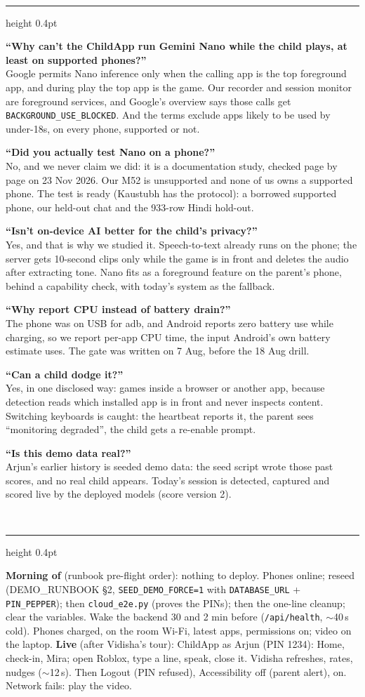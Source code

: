 \documentclass[10pt,a4paper]{article}
\newcommand{\sect}[1]{\vspace{2mm}{\color{teal}\bfseries\small\MakeUppercase{#1}}\\[0.6mm]\hrule height 0.4pt\vspace{1.2mm}}
\newcommand{\qa}[2]{\begin{minipage}{\linewidth}\small\textbf{\color{navy}#1}\\[0.3mm]\color{black!85}#2\end{minipage}\vspace{1.6mm}}
\begin{document}
\sect{Hardest Review 3 questions}
\qa{``Why can't the ChildApp run Gemini Nano while the child plays, at least on supported phones?''}{Google permits Nano inference only when the calling app is the top foreground app, and during play the top app is the game. Our recorder and session monitor are foreground services, and Google's overview says those calls get \texttt{BACKGROUND\_USE\_BLOCKED}. And the terms exclude apps likely to be used by under-18s, on every phone, supported or not.}
\qa{``Did you actually test Nano on a phone?''}{No, and we never claim we did: it is a documentation study, checked page by page on 23 Nov 2026. Our M52 is unsupported and none of us owns a supported phone. The test is ready (Kaustubh has the protocol): a borrowed supported phone, our held-out chat and the 933-row Hindi hold-out.}
\qa{``Isn't on-device AI better for the child's privacy?''}{Yes, and that is why we studied it. Speech-to-text already runs on the phone; the server gets 10-second clips only while the game is in front and deletes the audio after extracting tone. Nano fits as a foreground feature on the parent's phone, behind a capability check, with today's system as the fallback.}
\qa{``Why report CPU instead of battery drain?''}{The phone was on USB for adb, and Android reports zero battery use while charging, so we report per-app CPU time, the input Android's own battery estimate uses. The gate was written on 7 Aug, before the 18 Aug drill.}
\qa{``Can a child dodge it?''}{Yes, in one disclosed way: games inside a browser or another app, because detection reads which installed app is in front and never inspects content. Switching keyboards is caught: the heartbeat reports it, the parent sees ``monitoring degraded'', the child gets a re-enable prompt.}
\qa{``Is this demo data real?''}{Arjun's earlier history is seeded demo data: the seed script wrote those past scores, and no real child appears. Today's session is detected, captured and scored live by the deployed models (score version 2).}

\sect{Demo role --- you drive}
{\small \textbf{Morning of} (runbook pre-flight order): nothing to deploy. Phones online; reseed (DEMO\_RUNBOOK \S2, \texttt{SEED\_DEMO\_FORCE=1} with \texttt{DATABASE\_URL} + \texttt{PIN\_PEPPER}); then \texttt{cloud\_e2e.py} (proves the PINs); then the one-line cleanup; clear the variables. Wake the backend 30 and 2 min before (\texttt{/api/health}, $\sim$40\,s cold). Phones charged, on the room Wi-Fi, latest apps, permissions on; video on the laptop.
\textbf{Live} (after Vidisha's tour): ChildApp as Arjun (PIN 1234): Home, check-in, Mira; open Roblox, type a line, speak, close it. Vidisha refreshes, rates, nudges ($\sim$12\,s). Then Logout (PIN refused), Accessibility off (parent alert), on. Network fails: play the video.\par}
\end{document}
